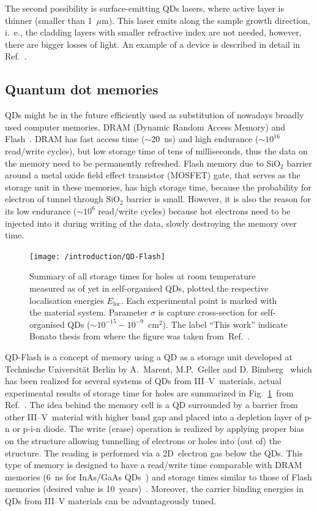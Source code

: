 \documentclass[
a4paper, %
11pt, %
onecolumn, %
openany, %
oldfontcommands,
]{memoir}
\begin{document}
The second possibility is surface-emitting QDs lasers, where active layer is thinner (smaller than 1~$\mu$m). This laser emits along the sample growth direction, i.~e., the cladding layers with smaller refractive index are not needed, however, there are bigger losses of light. An example of a device is described in detail in Ref.~\cite{Saito}.


\subsection*{Quantum dot memories}
QDs might be in the future efficiently used as substitution of nowadays broadly used computer memories, DRAM (Dynamic Random Access Memory) and Flash~\cite{Pavan,Sherwin}. DRAM has fast access time ($\sim$20~ns) and high endurance ($\sim10^{16}$ read/write cycles), but low storage time of tens of milliseconds, thus the data on the memory need to be permanently refreshed. Flash memory due to SiO$_2$ barrier around a metal oxide field effect transistor (MOSFET) gate, that serves as the storage unit in these memories, has high storage time, because the probability for electron of tunnel through SiO$_2$ barrier is small. However, it is also the reason for its low endurance ($\sim 10^{6}$ read/write cycles) because hot electrons need to be injected into it during writing of the data, slowly destroying the memory over time. 
%
\begin{figure}
	\centering
	\texttt{[image: /introduction/QD-Flash]}
	\caption{Summary of all storage times for holes at room temperature measured as of yet in self-organised QDs, plotted the respective localisation energies $E_\mathrm{loc}$. Each experimental point is marked with the material system. Parameter $\sigma$ is capture cross-section for self-organised QDs ($\sim10^{ -15} -10^ {-9}$~cm$^2$). The label \enquote{This work} indicate Bonato thesis from where the figure was taken from~Ref.~\cite{t_bonato}.}
	\label{fig:intr:QD-flash}
\end{figure}

QD-Flash is a concept of memory using a QD as a storage unit developed at Technische Universität Berlin by A.~Marent, M.P.~Geller and D. Bimberg~\cite{Marent_SST2011_QDFlash} which has been realized for several systems of QDs from III--V~materials, actual experimental results of storage time for holes are summarized in Fig.~\ref{fig:intr:QD-flash}~from Ref.~\cite{t_bonato}. The idea behind the memory cell is a QD surrounded by a barrier from other III--V~material with higher band gap and placed into a depletion layer of p-n or p-i-n diode. The write (erase) operation is realized by applying proper bias on the structure allowing tunnelling of electrons or holes into (out of) the structure. The reading is performed via a 2D~electron gas below the QDs. This type of memory is designed to have a read/write time comparable with DRAM memories (6~ns for InAs/GaAs QDs~\cite{GellerAPL}) and storage times similar to those of Flash memories (desired value is 10~years)~\cite{GellerAPL,GellerJOP}. Moreover, the carrier binding energies in QDs from III--V materials can be advantageously tuned. 
\end{document}
